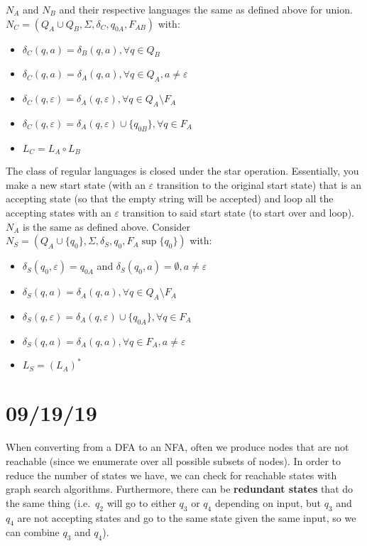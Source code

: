 \documentclass[12 pt]{article}
\begin{document}
$N_A$ and $N_B$ and their respective languages the same as defined
above for union.
\\ $N_C = (Q_A \cup Q_B, \Sigma, \delta_C, q_{0A}, F_{AB})$ with:
\begin{itemize}
\item $\delta_C(q,a) = \delta_B (q,a), \forall q \in Q_B$
\item $\delta_C(q,a) = \delta_A (q,a), \forall q \in Q_A, a \neq
  \varepsilon$
\item $\delta_C(q,\varepsilon) = \delta_A(q, \varepsilon), \forall q
  \in Q_A \setminus F_A$
\item $\delta_C(q,\varepsilon) = \delta_A (q,\varepsilon) \cup
  \{q_{0B}\}, \forall q \in F_A$
\item $L_C = L_A \circ L_B$
\end{itemize}

The class of regular languages is closed under the star
operation. Essentially, you make a new start state (with an
$\varepsilon$ transition to the original start state) that is an
accepting state (so that the empty string will be accepted) and loop
all the accepting states with an $\varepsilon$ transition to said
start state (to start over and loop).
\\ $N_A$ is the same as defined above. Consider $N_S = (Q_A \cup
\{q_0\}, \Sigma, \delta_S, q_0, F_A \sup \{q_0\})$ with:
\begin{itemize}
\item $\delta_S(q_0, \varepsilon) = q_{0A}$ and $\delta_S(q_0,a) =
  \emptyset, a \neq \varepsilon$
\item $\delta_S(q,a) = \delta_A(q,a), \forall q \in Q_A\setminus F_A$
\item $\delta_S(q,\varepsilon) = \delta_A(q,\varepsilon) \cup
  \{q_{0A}\}, \forall q \in F_A$
\item $\delta_S(q,a) = \delta_A(q,a), \forall q \in F_A, a \neq
  \varepsilon$
\item $L_S = (L_A)^*$
\end{itemize}
\section{09/19/19}
When converting from a DFA to an NFA, often we produce nodes that are
not reachable (since we enumerate over all possible subsets of
nodes). In order to reduce the number of states we have, we can check
for reachable states with graph search algorithms. Furthermore, there
can be \textbf{redundant states} that do the same thing (i.e.\ $q_2$
will go to either $q_3$ or $q_4$ depending on input, but $q_3$ and
$q_4$ are not accepting states and go to the same state given the same
input, so we can combine $q_3$ and $q_4$).
\end{document}

